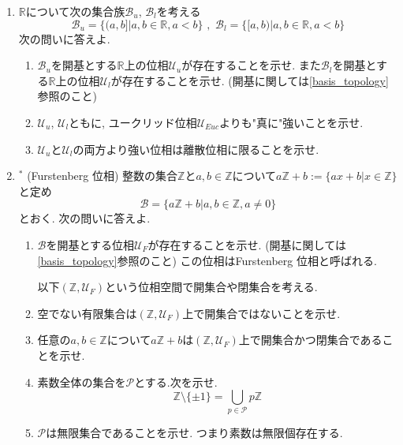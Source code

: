 \documentclass[dvipdfmx,a4paper,11pt]{article}
\newcommand{\R}{\mathbb{R}}
\newcommand{\Z}{\mathbb{Z}}
\theoremstyle{definition}
\begin{document}
\begin{enumerate}[label=\textbf{問}\ref*{sec-subspace}.\arabic*]
\item $\R$について次の集合族$\mathscr{B}_u$, $\mathscr{B}_l$を考える
$$
\mathscr{B}_u = \{(a,b]| a,b \in \R, a<b\} \,\,,\,\,
\mathscr{B}_l = \{[a,b)| a,b \in \R, a<b\}
$$
次の問いに答えよ.
	\begin{enumerate}
	\setlength{\parskip}{0cm} 
  \setlength{\itemsep}{0cm} 
	\item $\mathscr{B}_u $を開基とする$\R$上の位相$\mathscr{U}_u$が存在することを示せ. %
	また$\mathscr{B}_l$を開基とする$\R$上の位相$\mathscr{U}_l$が存在することを示せ. (開基に関しては\ref{basis_topology}参照のこと)
	\item $\mathscr{U}_u$, $\mathscr{U}_l$ともに, ユークリッド位相$\mathscr{U}_{Euc}$よりも"真に"強いことを示せ. 
	\item $\mathscr{U}_u$と$\mathscr{U}_l$の両方より強い位相は離散位相に限ることを示せ.
	\end{enumerate}



\item\label{Furstenberg} $^{*}$ (Furstenberg 位相) 整数の集合$\Z$と$a,b \in \Z$について$
a\Z + b := \{ ax + b | x \in \Z\}$と定め
$$
\mathscr{B} = \{ a\Z + b | a,b\in \Z, a \neq 0 \} 
$$
とおく. 次の問いに答えよ. 
	\begin{enumerate}
	\setlength{\parskip}{0cm} 
  \setlength{\itemsep}{0cm} 
	\item $\mathscr{B}$を開基とする位相$\mathscr{U}_F$が存在することを示せ. (開基に関しては\ref{basis_topology}参照のこと) この位相はFurstenberg 位相と呼ばれる. 
	
\hspace{-22pt}以下$(\Z,\mathscr{U}_F)$という位相空間で開集合や閉集合を考える. 
	\item 空でない有限集合は$(\Z, \mathscr{U}_F)$上で開集合ではないことを示せ. 
	\item 任意の$a,b \in \Z$について$a\Z + b$は$(\Z, \mathscr{U}_F)$上で開集合かつ閉集合であることを示せ.
	\item 素数全体の集合を$\mathcal{P}$とする.次を示せ. 
	$$\Z \setminus \{ \pm 1\} = \bigcup_{p \in \mathcal{P}} p\Z$$
	\item $\mathcal{P}$は無限集合であることを示せ. つまり素数は無限個存在する.
	\end{enumerate}







\end{enumerate}
\end{document}
